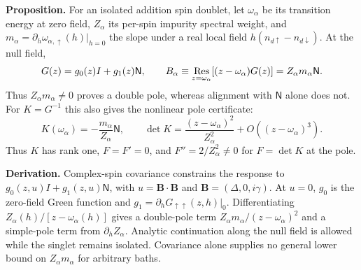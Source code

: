 \documentclass[11pt,a4paper]{article}
\newcommand{\N}{\mathsf N}
\begin{document}
\textbf{Proposition.} For an isolated addition spin doublet, let $\omega_\alpha$
be its transition energy at zero field, $Z_\alpha$ its per-spin impurity
spectral weight, and
$m_\alpha=\partial_h\omega_{\alpha,\uparrow}(h)|_{h=0}$ the slope under a
real local field $h(n_{d\uparrow}-n_{d\downarrow})$. At the null field,
\begin{equation}
 G(z)=g_0(z)I+g_1(z)\N,\qquad
 B_\alpha\equiv\mathop{\rm Res}_{z=\omega_\alpha}
 [(z-\omega_\alpha)G(z)]=Z_\alpha m_\alpha\N .
 \label{eq:residue}
\end{equation}
Thus $Z_\alpha m_\alpha\ne0$ proves a double pole, whereas alignment with
$\N$ alone does not. For $K=G^{-1}$ this also gives the nonlinear pole
certificate:
\begin{equation}
 K(\omega_\alpha)=-\frac{m_\alpha}{Z_\alpha}\N,\qquad
 \det K=\frac{(z-\omega_\alpha)^2}{Z_\alpha^2}
        +O((z-\omega_\alpha)^3).
\end{equation}
Thus $K$ has rank one, $F=F'=0$, and $F''=2/Z_\alpha^2\ne0$ for
$F=\det K$ at the pole.

\textbf{Derivation.} Complex-spin covariance constrains the response to
$g_0(z,u)I+g_1(z,u)\N$, with $u=\bm B\cdot\bm B$ and
$\bm B=(\Delta,0,i\gamma)$. At $u=0$, $g_0$ is the
zero-field Green function and $g_1=\partial_hG_{\uparrow\uparrow}(z,h)|_0$.
Differentiating $Z_\alpha(h)/[z-\omega_\alpha(h)]$ gives a double-pole term
$Z_\alpha m_\alpha/(z-\omega_\alpha)^2$ and a simple-pole term from
$\partial_hZ_\alpha$. Analytic continuation along the null field is allowed
while the singlet remains isolated. Covariance alone supplies no general
lower bound on $Z_\alpha m_\alpha$ for arbitrary baths.

\newpage
\end{document}
